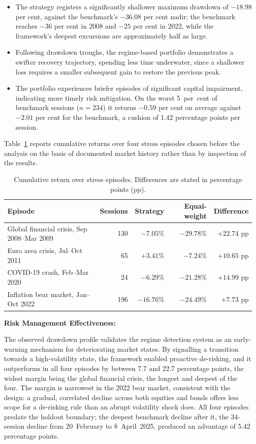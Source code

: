 \documentclass{singlecol-new}
\theoremstyle{TH}{
\newtheorem{lemma}{Lemma}
\newtheorem{theorem}[lemma]{Theorem}
\newtheorem{corrolary}[lemma]{Corrolary}
\newtheorem{conjecture}[lemma]{Conjecture}
\newtheorem{proposition}[lemma]{Proposition}
\newtheorem{claim}[lemma]{Claim}
\newtheorem{stheorem}[lemma]{Wrong Theorem}
\newtheorem{algorithm}{Algorithm}
}
\theoremstyle{THrm}{
\newtheorem{definition}{Definition}[section]
\newtheorem{question}{Question}[section]
\newtheorem{remark}{Remark}
\newtheorem{scheme}{Scheme}
}
\theoremstyle{THhit}{
\newtheorem{case}{Case}[section]
}
\begin{document}
\begin{itemize}
\item The strategy registers a significantly shallower maximum drawdown of $-18.98$ per
cent, against the benchmark's $-36.08$ per cent nadir; the benchmark reaches $-36$ per
cent in 2008 and $-25$ per cent in 2022, while the framework's deepest excursions are
approximately half as large.
\item Following drawdown troughs, the regime-based portfolio demonstrates a swifter
recovery trajectory, spending less time underwater, since a shallower loss requires a
smaller subsequent gain to restore the previous peak.
\item The portfolio experiences briefer episodes of significant capital impairment,
indicating more timely risk mitigation. On the worst 5~per~cent of benchmark sessions
($n = 234$) it returns $-0.59$ per cent on average against $-2.01$ per cent for the
benchmark, a cushion of 1.42 percentage points per session.
\end{itemize}

Table~\ref{tab:episodes} reports cumulative returns over four stress episodes chosen
before the analysis on the basis of documented market history rather than by inspection
of the results.

\begin{table}[!ht]
\centering
\caption{Cumulative return over stress episodes. Differences are stated in percentage
points (pp).}
\label{tab:episodes}
\footnotesize
\begin{tabular}{p{3.6cm}rrrr}
\hline
\textbf{Episode} & \textbf{Sessions} & \textbf{Strategy} & \textbf{Equal-weight} & \textbf{Difference} \\
\hline
Global financial crisis, Sep 2008--Mar 2009 & 130 & $-7.05$\% & $-29.78$\% & $+22.74$ pp \\
Euro area crisis, Jul--Oct 2011 & 65 & $+3.41$\% & $-7.24$\% & $+10.65$ pp \\
COVID-19 crash, Feb--Mar 2020 & 24 & $-6.29$\% & $-21.28$\% & $+14.99$ pp \\
Inflation bear market, Jan--Oct 2022 & 196 & $-16.76$\% & $-24.49$\% & $+7.73$ pp \\
\hline
\end{tabular}
\end{table}

\textbf{Risk Management Effectiveness:}

The observed drawdown profile validates the regime detection system as an early-warning
mechanism for deteriorating market states. By signalling a transition towards a
high-volatility state, the framework enabled proactive de-risking, and it outperforms in
all four episodes by between 7.7 and 22.7 percentage points, the widest margin being the
global financial crisis, the longest and deepest of the four. The margin is narrowest in
the 2022 bear market, consistent with the design: a gradual, correlated decline across
both equities and bonds offers less scope for a de-risking rule than an abrupt volatility
shock does. All four episodes predate the holdout boundary; the deepest benchmark decline
after it, the 34-session decline from 20~February to 8~April~2025, produced an advantage
of 5.42 percentage points.
\end{document}
